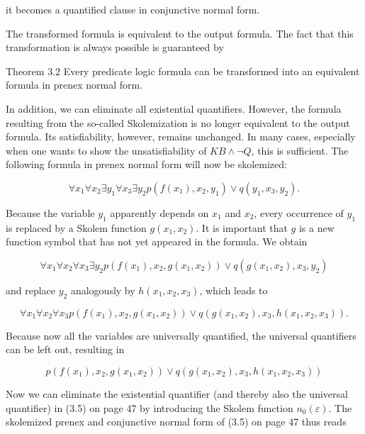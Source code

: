 \documentclass[10pt]{article}
\begin{document}
it becomes a quantified clause in conjunctive normal form.

The transformed formula is equivalent to the output formula. The fact that this transformation is always possible is guaranteed by

Theorem 3.2 Every predicate logic formula can be transformed into an equivalent formula in prenex normal form.

In addition, we can eliminate all existential quantifiers. However, the formula resulting from the so-called Skolemization is no longer equivalent to the output formula. Its satisfiability, however, remains unchanged. In many cases, especially when one wants to show the unsatisfiability of $K B \wedge \neg Q$, this is sufficient. The following formula in prenex normal form will now be skolemized:

$$
\forall x_{1} \forall x_{2} \exists y_{1} \forall x_{3} \exists y_{2} p\left(f\left(x_{1}\right), x_{2}, y_{1}\right) \vee q\left(y_{1}, x_{3}, y_{2}\right) .
$$

Because the variable $y_{1}$ apparently depends on $x_{1}$ and $x_{2}$, every occurrence of $y_{1}$ is replaced by a Skolem function $g\left(x_{1}, x_{2}\right)$. It is important that $g$ is a new function symbol that has not yet appeared in the formula. We obtain

$$
\forall x_{1} \forall x_{2} \forall x_{3} \exists y_{2} p\left(f\left(x_{1}\right), x_{2}, g\left(x_{1}, x_{2}\right)\right) \vee q\left(g\left(x_{1}, x_{2}\right), x_{3}, y_{2}\right)
$$

and replace $y_{2}$ analogously by $h\left(x_{1}, x_{2}, x_{3}\right)$, which leads to

$$
\forall x_{1} \forall x_{2} \forall x_{3} p\left(f\left(x_{1}\right), x_{2}, g\left(x_{1}, x_{2}\right)\right) \vee q\left(g\left(x_{1}, x_{2}\right), x_{3}, h\left(x_{1}, x_{2}, x_{3}\right)\right) .
$$

Because now all the variables are universally quantified, the universal quantifiers can be left out, resulting in

$$
p\left(f\left(x_{1}\right), x_{2}, g\left(x_{1}, x_{2}\right)\right) \vee q\left(g\left(x_{1}, x_{2}\right), x_{3}, h\left(x_{1}, x_{2}, x_{3}\right)\right)
$$

Now we can eliminate the existential quantifier (and thereby also the universal quantifier) in (3.5) on page 47 by introducing the Skolem function $n_{0}(\varepsilon)$. The skolemized prenex and conjunctive normal form of (3.5) on page 47 thus reads
\end{document}

